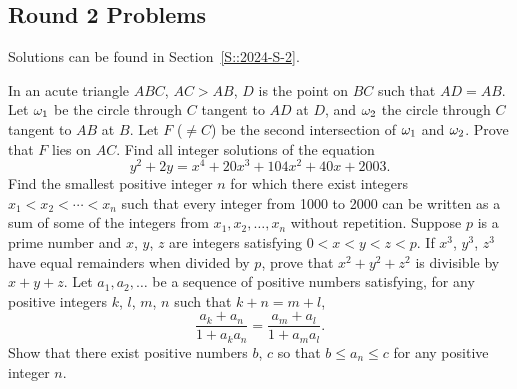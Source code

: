 \subsection{Round 2 Problems}

Solutions can be found in Section~\ref{S::2024-S-2}.

\begin{enumerate}
    \hyperrefitem[Q::2024-S-2-1] In an acute triangle $ABC$, $AC > AB$, $D$ is the point on $BC$ such that $AD = AB$. Let $\omega_1$ be the circle through $C$ tangent to $AD$ at $D$, and $\omega_2$ the circle through $C$ tangent to $AB$ at $B$. Let $F$ ($\neq C$) be the second intersection of $\omega_1$ and $\omega_2$. Prove that $F$ lies on $AC$.
    \hyperrefitem[Q::2024-S-2-2] Find all integer solutions of the equation \[y^2 + 2y = x^4 + 20x^3 + 104x^2 + 40x + 2003.\]
    \hyperrefitem[Q::2024-S-2-3] Find the smallest positive integer $n$ for which there exist integers $x_1 < x_2 < \cdots < x_n$ such that every integer from 1000 to 2000 can be written as a sum of some of the integers from $x_1, x_2, \ldots, x_n$ without repetition.
    \hyperrefitem[Q::2024-S-2-4] Suppose $p$ is a prime number and $x$, $y$, $z$ are integers satisfying $0 < x < y < z < p$. If $x^3$, $y^3$, $z^3$ have equal remainders when divided by $p$, prove that $x^2 + y^2 + z^2$ is divisible by $x + y + z$.
    \hyperrefitem[Q::2024-S-2-5] Let $a_1, a_2, \ldots$ be a sequence of positive numbers satisfying, for any positive integers $k$, $l$, $m$, $n$ such that $k + n = m + l$, \[\frac{a_k + a_n}{1 + a_k a_n} = \frac{a_m + a_l}{1 + a_m a_l}.\] Show that there exist positive numbers $b$, $c$ so that $b \leq a_n \leq c$ for any positive integer $n$.
\end{enumerate}